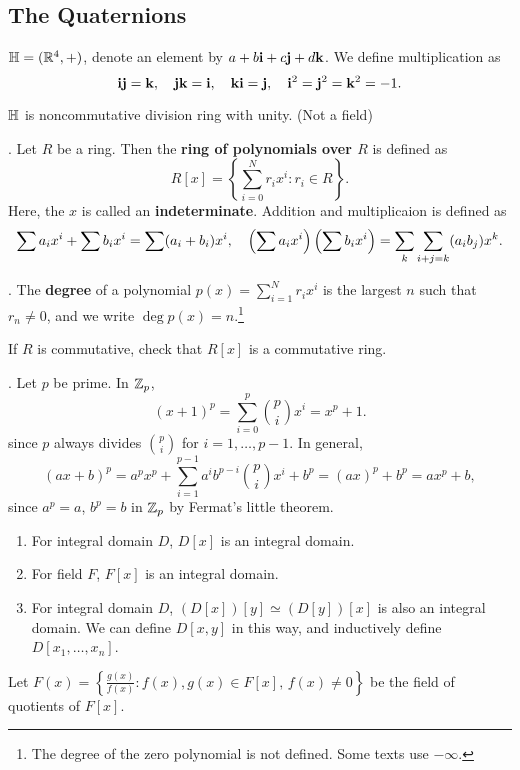 \subsection*{The Quaternions}

\(\bb{H} = (\R^4, +)\), denote an element by \(a + b\bf{i} + c\bf{j} + d\bf{k}\). We define multiplication as
\[
    \bf{ij = k},\quad \bf{jk = i},\quad \bf{ki = j},\quad \bf{i}^2 = \bf{j}^2 = \bf{k}^2 = -1.
\]

\(\bb{H}\) is noncommutative division ring with unity. (Not a field)

\setcounter{topic}{21}

.  Let \(R\) be a ring. Then the \textbf{ring of polynomials over \(R\)} is defined as
\[
    R[x] = \left\{\sum_{i=0}^N r_ix^i : r_i \in R \right\}.
\]
Here, the \(x\) is called an \textbf{indeterminate}. Addition and multiplicaion is defined as
\[
    \sum a_i x^i + \sum b_i x^i = \sum (a_i + b_i) x^i, \quad \paren{\sum a_i x^i} \paren{\sum b_i x^i} = \sum_k \sum_{i + j = k} (a_i b_j) x^k.
\]

.  The \textbf{degree} of a polynomial \(p(x) = \sum_{i=1}^N r_i x^i\) is the largest \(n\) such that \(r_n \neq 0\), and we write \(\deg p(x) = n\).\footnote{The degree of the zero polynomial is not defined. Some texts use \(-\infty\).}

\rmk If \(R\) is commutative, check that \(R[x]\) is a commutative ring.

\ex. Let \(p\) be prime. In \(\Z_p\),
\[
    (x + 1)^p = \sum_{i=0}^p {p \choose i} x^i = x^p + 1.
\]
since \(p\) always divides \({p \choose i}\) for \(i = 1, \dots, p - 1\). In general,
\[
    (ax + b)^p = a^px^p + \sum_{i=1}^{p-1} a^ib^{p-i}{p \choose i} x^i + b^p = (ax)^p + b^p = ax^p + b,
\]
since \(a^p = a\), \(b^p = b\) in \(\Z_p\) by Fermat's little theorem.

\rmk
\begin{enumerate}
    \item For integral domain \(D\), \(D[x]\) is an integral domain.
    \item For field \(F\), \(F[x]\) is an integral domain.
    \item For integral domain \(D\), \((D[x])[y] \simeq (D[y])[x]\) is also an integral domain. We can define \(D[x, y]\) in this way, and inductively define \(D[x_1, \dots, x_n]\).
\end{enumerate}

\notation Let \(F(x) = \left\{\frac{g(x)}{f(x)} : f(x), g(x) \in F[x],\, f(x) \neq 0\right\}\) be the field of quotients of \(F[x]\).

